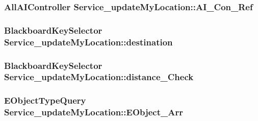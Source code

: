 \subsubsection[{\texorpdfstring{A\+I\+\_\+\+Con\+\_\+\+Ref}{AI_Con_Ref}}]{\setlength{\rightskip}{0pt plus 5cm}All\+A\+I\+Controller Service\+\_\+update\+My\+Location\+::\+A\+I\+\_\+\+Con\+\_\+\+Ref\hspace{0.3cm}{\ttfamily [private]}}\hypertarget{class_service__update_my_location_a9119fdd7362553820385271bb40d9e36}{}\label{class_service__update_my_location_a9119fdd7362553820385271bb40d9e36}
\subsubsection[{\texorpdfstring{destination}{destination}}]{\setlength{\rightskip}{0pt plus 5cm}Blackboard\+Key\+Selector Service\+\_\+update\+My\+Location\+::destination}\hypertarget{class_service__update_my_location_aeda83c71d6edf61186416547abacf575}{}\label{class_service__update_my_location_aeda83c71d6edf61186416547abacf575}
\subsubsection[{\texorpdfstring{distance\+\_\+\+Check}{distance_Check}}]{\setlength{\rightskip}{0pt plus 5cm}Blackboard\+Key\+Selector Service\+\_\+update\+My\+Location\+::distance\+\_\+\+Check}\hypertarget{class_service__update_my_location_a585e2ac19aed8fd8807fd9f0ef987825}{}\label{class_service__update_my_location_a585e2ac19aed8fd8807fd9f0ef987825}
\subsubsection[{\texorpdfstring{E\+Object\+\_\+\+Arr}{EObject_Arr}}]{\setlength{\rightskip}{0pt plus 5cm}E\+Object\+Type\+Query Service\+\_\+update\+My\+Location\+::\+E\+Object\+\_\+\+Arr\hspace{0.3cm}{\ttfamily [private]}}\hypertarget{class_service__update_my_location_a44cdb3affc413f6f409e39cea8704d77}{}\label{class_service__update_my_location_a44cdb3affc413f6f409e39cea8704d77}
